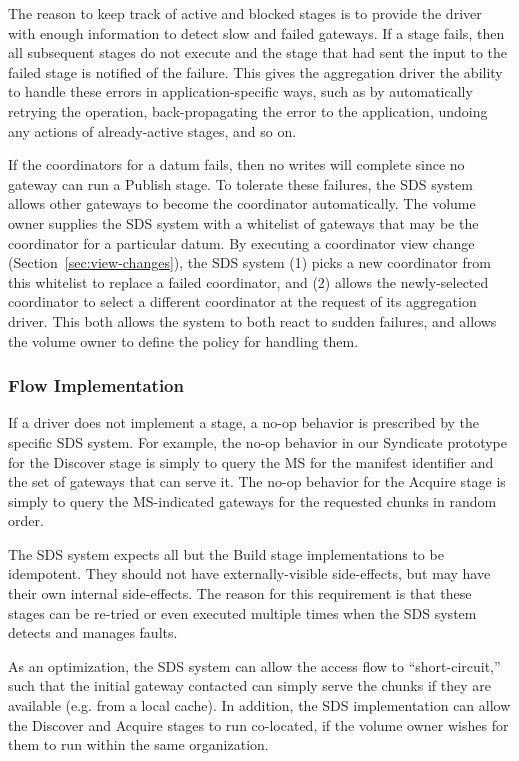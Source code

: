 The reason to keep track of active and blocked stages is to provide
the driver with enough information to detect slow and failed gateways.
If a stage fails, then all subsequent stages do not execute
and the stage that had sent the input to the
failed stage is notified of the failure.  This gives the aggregation driver
the ability to handle these errors in application-specific ways, such as by
automatically retrying the operation, back-propagating the error to the application, 
undoing any actions of already-active stages, and so on.

If the coordinators for a datum fails, then no writes will complete since no
gateway can run a Publish stage.  To
tolerate these failures, the SDS system allows other gateways to
become the coordinator automatically.  The volume owner supplies the SDS system with a
whitelist of gateways that may be the coordinator for a particular datum.
By executing a coordinator view change (Section~\ref{sec:view-changes}), the SDS
system (1) picks a new coordinator from this
whitelist to replace a failed coordinator, and (2) allows the newly-selected coordinator
to select a different coordinator at the request of its aggregation driver.
This both allows the system to both react to sudden failures, and allows the volume
owner to define the policy for handling them.

\subsubsection{Flow Implementation}

If a driver does not implement a stage, a no-op behavior is prescribed by the
specific SDS system.  For example, the no-op behavior in our Syndicate prototype for the
Discover stage is simply to query the MS for the manifest identifier and the 
set of gateways that can serve it.  The no-op behavior for the Acquire
stage is simply to query the MS-indicated gateways for the requested chunks
in random order.

The SDS system expects all but the Build stage implementations to be
idempotent.  They should not have externally-visible side-effects, but may have
their own internal side-effects.  The reason
for this requirement is that these stages can be re-tried or even executed
multiple times when the SDS system detects and manages faults.

As an optimization, the SDS system can allow the access flow to
``short-circuit,'' such that the initial gateway contacted can simply serve the
chunks if they are available (e.g. from a local cache).  In addition, the SDS
implementation can allow the Discover and Acquire stages to run co-located, if
the volume owner wishes for them to run within the same organization.

